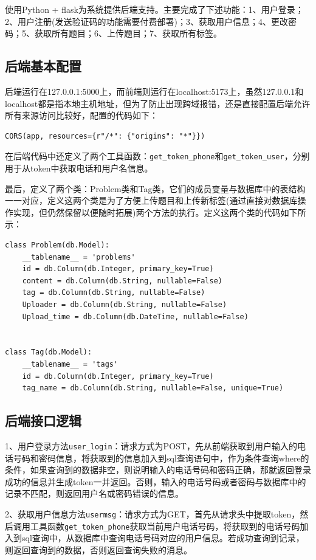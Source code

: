 \documentclass[a4paper,AutoFakeBold={2.7}]{ctexart} %
\begin{document}
使用Python + flask为系统提供后端支持。主要完成了下述功能：1、用户登录；2、用户注册(发送验证码的功能需要付费部署)；3、获取用户信息；4、更改密码；5、获取所有题目；6、上传题目；7、获取所有标签。

\subsection{后端基本配置}

后端运行在127.0.0.1:5000上，而前端则运行在localhost:5173上，虽然127.0.0.1和localhost都是指本地主机地址，但为了防止出现跨域报错，还是直接配置后端允许所有来源访问比较好，配置的代码如下：
\begin{lstlisting}
CORS(app, resources={r"/*": {"origins": "*"}})
\end{lstlisting}

在后端代码中还定义了两个工具函数：\verb|get_token_phone|和\verb|get_token_user|，分别用于从token中获取电话和用户名信息。

最后，定义了两个类：Problem类和Tag类，它们的成员变量与数据库中的表结构一一对应，定义这两个类是为了方便上传题目和上传新标签(通过直接对数据库操作实现，但仍然保留以便随时拓展)两个方法的执行。定义这两个类的代码如下所示：

\begin{lstlisting}
class Problem(db.Model):
    __tablename__ = 'problems'
    id = db.Column(db.Integer, primary_key=True)
    content = db.Column(db.String, nullable=False)
    tag = db.Column(db.String, nullable=False)
    Uploader = db.Column(db.String, nullable=False)
    Upload_time = db.Column(db.DateTime, nullable=False)


class Tag(db.Model):
    __tablename__ = 'tags'
    id = db.Column(db.Integer, primary_key=True)
    tag_name = db.Column(db.String, nullable=False, unique=True)
\end{lstlisting}

\subsection{后端接口逻辑}

1、用户登录方法\verb|user_login|：请求方式为POST，先从前端获取到用户输入的电话号码和密码信息，将获取到的信息加入到sql查询语句中，作为条件查询where的条件，如果查询到的数据非空，则说明输入的电话号码和密码正确，那就返回登录成功的信息并生成token一并返回。否则，输入的电话号码或者密码与数据库中的记录不匹配，则返回用户名或密码错误的信息。

2、获取用户信息方法\verb|usermsg|：请求方式为GET，首先从请求头中提取token，然后调用工具函数\verb|get_token_phone|获取当前用户电话号码，将获取到的电话号码加入到sql查询中，从数据库中查询电话号码对应的用户信息。若成功查询到记录，则返回查询到的数据，否则返回查询失败的消息。
\end{document}
